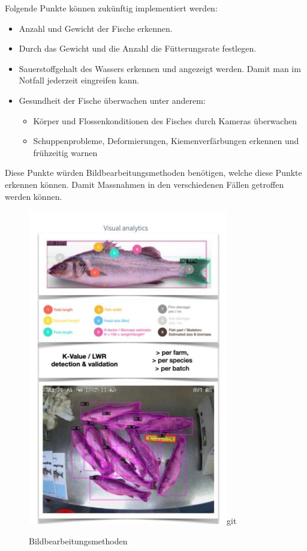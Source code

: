 \documentclass[../main.tex]{subfiles}
\begin{document}
	Folgende Punkte können zukünftig implementiert werden:
	\begin{itemize}
		\item Anzahl und Gewicht der Fische erkennen.
		\item Durch das Gewicht und die Anzahl die Fütterungsrate festlegen.
		\item Sauerstoffgehalt des Wassers erkennen und angezeigt werden. Damit man im Notfall jederzeit eingreifen kann.
		\item Gesundheit der Fische überwachen unter anderem:
		\begin{itemize}
			\item Körper und Flossenkonditionen des Fisches durch Kameras überwachen
			\item Schuppenprobleme, Deformierungen, Kiemenverfärbungen erkennen und frühzeitig warnen
		\end{itemize}
	\end{itemize}	
	Diese Punkte würden Bildbearbeitungsmethoden benötigen, welche diese Punkte erkennen können. Damit Massnahmen in den verschiedenen Fällen getroffen werden können. 
	\par 
	\begin{figure}[H]
		\centering
		\includegraphics{../images/Imageprocessing}git 
		\caption{Bildbearbeitungsmethoden}
		\label{fig:Imageprocessing}
	\end{figure}
	
\end{document}
